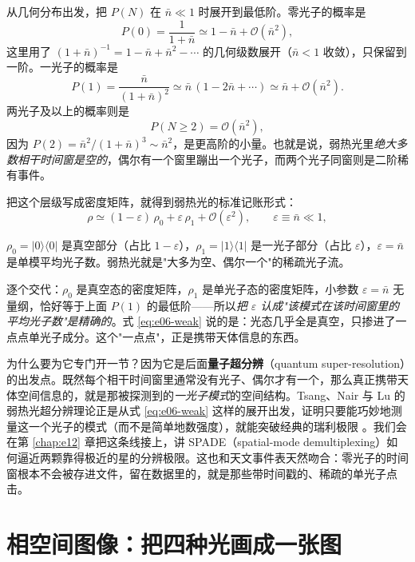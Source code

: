 从几何分布出发，把 \(P(N)\) 在 \(\bar n\ll 1\) 时展开到最低阶。零光子的概率是
\[
  P(0)=\frac{1}{1+\bar n}\simeq 1-\bar n+\mathcal O(\bar n^{2}),
\]
这里用了 \((1+\bar n)^{-1}=1-\bar n+\bar n^2-\cdots\) 的几何级数展开（\(\bar n<1\) 收敛），只保留到一阶。一光子的概率是
\[
  P(1)=\frac{\bar n}{(1+\bar n)^{2}}
  \simeq\bar n\,(1-2\bar n+\cdots)
  \simeq\bar n+\mathcal O(\bar n^{2}).
\]
两光子及以上的概率则是
\[
  P(N\ge 2)=\mathcal O(\bar n^{2}),
\]
因为 \(P(2)=\bar n^2/(1+\bar n)^3\sim\bar n^2\)，是更高阶的小量。也就是说，弱热光里\emph{绝大多数相干时间窗是空的}，偶尔有一个窗里蹦出一个光子，而两个光子同窗则是二阶稀有事件。

把这个层级写成密度矩阵，就得到弱热光的标准记账形式：
\begin{equation}
  \rho\simeq(1-\varepsilon)\,\rho_0+\varepsilon\,\rho_1+\mathcal O(\varepsilon^{2}),
  \qquad
  \varepsilon\equiv\bar n\ll 1,
  \label{eq:e06-weak}
\end{equation}
\begin{formulaexplain}
\(\rho_0=|0\rangle\langle 0|\) 是真空部分（占比 \(1-\varepsilon\)），\(\rho_1=|1\rangle\langle 1|\) 是一光子部分（占比 \(\varepsilon\)），\(\varepsilon=\bar n\) 是单模平均光子数。弱热光就是"大多为空、偶尔一个"的稀疏光子流。
\end{formulaexplain}

逐个交代：\(\rho_0\) 是真空态的密度矩阵，\(\rho_1\) 是单光子态的密度矩阵，小参数 \(\varepsilon=\bar n\) 无量纲，恰好等于上面 \(P(1)\) 的最低阶——所以\emph{把 \(\varepsilon\) 认成"该模式在该时间窗里的平均光子数"是精确的}。式 \eqref{eq:e06-weak} 说的是：光态几乎全是真空，只掺进了一点点单光子成分。这个"一点点"，正是携带天体信息的东西。

为什么要为它专门开一节？因为它是后面\textbf{量子超分辨}（quantum super-resolution）的出发点。既然每个相干时间窗里通常没有光子、偶尔才有一个，那么真正携带天体空间信息的，就是那被探测到的\emph{一光子模式}的空间结构。Tsang、Nair 与 Lu 的弱热光超分辨理论正是从式 \eqref{eq:e06-weak} 这样的展开出发，证明只要能巧妙地测量这一个光子的模式（而不是简单地数强度），就能突破经典的瑞利极限 \citep{2015Optic...2..646T,2016PhRvX...6c1033T}。我们会在第 \ref{chap:e12} 章把这条线接上，讲 SPADE（spatial-mode demultiplexing）如何逼近两颗靠得极近的星的分辨极限。这也和天文事件表天然吻合：零光子的时间窗根本不会被存进文件，留在数据里的，就是那些带时间戳的、稀疏的单光子点击。

\section{相空间图像：把四种光画成一张图}
\label{sec:e06-phasespace}

